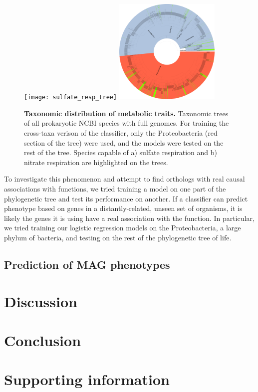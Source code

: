 \documentclass[10pt,letterpaper]{article}
\begin{document}
\begin{figure}
\texttt{[image: sulfate\_resp\_tree]}
\includegraphics[width=0.45\textwidth]{nitrate_resp_tree}
\caption{{\bf Taxonomic distribution of metabolic traits.}
Taxonomic trees of all prokaryotic NCBI species with full genomes. For training the cross-taxa verison of the classifier, only the Proteobacteria (red section of the tree) were used, and the models were tested on the rest of the tree. Species capable of a) sulfate respiration and b) nitrate respiration are highlighted on the trees.}
\label{fig4}
\end{figure}

To investigate this phenomenon and attempt to find orthologs with real causal associations with functions, we tried training a model on one part of the phylogenetic tree and test its performance on another. If a classifier can predict phenotype based on genes in a distantly-related, unseen set of organisms, it is likely the genes it is using have a real association with the function. In particular, we tried training our logistic regression models on the Proteobacteria, a large phylum of bacteria, and testing on the rest of the phylogenetic tree of life.

\subsection*{Prediction of MAG phenotypes}


\section*{Discussion}


\section*{Conclusion}


\section*{Supporting information}
\end{document}
